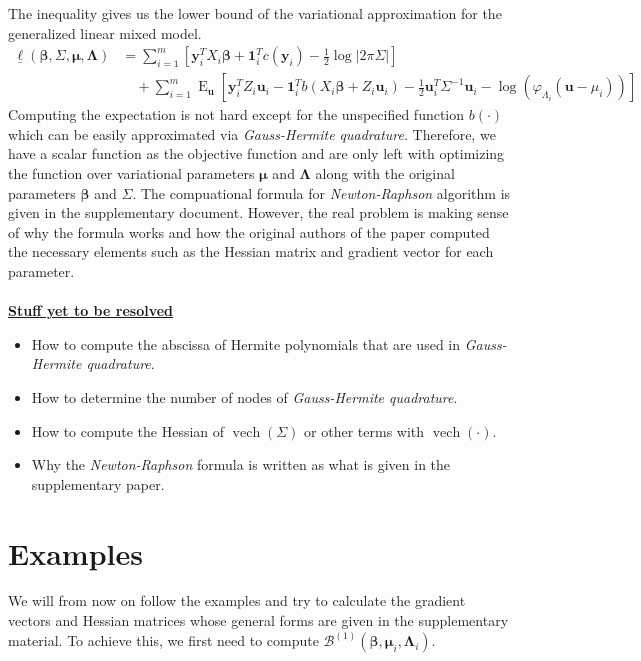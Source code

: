 \documentclass[11pt]{article}
\newcommand{\bs}{\boldsymbol}
\newcommand{\opn}{\operatorname}
\begin{document}
The inequality gives us the lower bound of the variational approximation for the generalized linear mixed model.
\begin{align*}
\underline{\ell} \left(\bs{\beta}, \Sigma , \bs{\mu}, \bs{\Lambda} \right) &= \sum_{i=1}^{m} \left[\bs{y}_{i}^{T}X_{i}\bs{\beta} + \bs{1}_{i}^{T}c\left(\bs{y}_{i} \right) - \frac{1}{2} \log \left|2\pi \Sigma \right|\right] \\
& \quad + \sum_{i=1}^{m} \opn{E}_{\bs{u}} \left[\bs{y}_{i}^{T}Z_{i}\bs{u}_{i} - \bs{1}_{i}^{T}b\left(X_{i}\bs{\beta} + Z_{i}\bs{u}_{i} \right)-\frac{1}{2}\bs{u}_{i}^{T}\Sigma^{-1}\bs{u}_{i} - \log \left(\varphi_{\Lambda_{i}} \left(\bs{u} - \mu_{i} \right) \right) \right]
\end{align*}
Computing the expectation is not hard except for the unspecified function $b(\cdot)$ which can be easily approximated via \emph{Gauss-Hermite quadrature}. Therefore, we have a scalar function as the objective function and are only left with optimizing the function over variational parameters $\bs{\mu}$ and $\bs{\Lambda}$ along with the original parameters $\bs{\beta}$ and $\Sigma$. The compuational formula for \emph{Newton-Raphson} algorithm is given in the supplementary document. However, the real problem is making sense of why the formula works and how the original authors of the paper computed the necessary elements such as the Hessian matrix and gradient vector for each parameter.\\
\\
\underline{\textbf{Stuff yet to be resolved}}
\begin{itemize}
  \item How to compute the abscissa of Hermite polynomials that are used in \emph{Gauss-Hermite quadrature}.
  \item How to determine the number of nodes of \emph{Gauss-Hermite quadrature}.
  \item How to compute the Hessian of $\opn{vech}\left(\Sigma \right)$ or other terms with $\opn{vech}\left(\cdot \right)$.
  \item Why the \emph{Newton-Raphson} formula is written as what is given in the supplementary paper.
\end{itemize}

\section{Examples}
We will from now on follow the examples and try to calculate the gradient vectors and Hessian matrices whose general forms are given in the supplementary material. To achieve this, we first need to compute $\mathcal{B}^{(1)}\left(\bs{\beta}, \bs{\mu}_{i}, \bs{\Lambda}_{i} \right)$.
\end{document}
